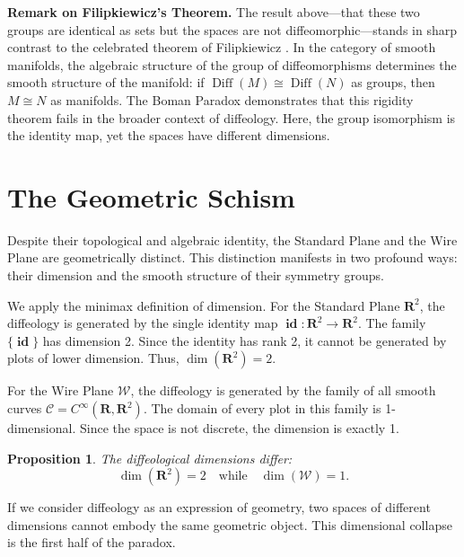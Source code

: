 \documentclass[10pt,letterpaper,reqno]{amsart}
\newcommand{\RR}{\mathbf{R}}
\newcommand{\cW}{\mathcal{W}}
\DeclareMathOperator{\id}{\mathbf{id}}
\DeclareMathOperator{\Diff}{Diff}
\newtheorem*{proposition}{Proposition}
\begin{document}
  \textbf{Remark on Filipkiewicz's Theorem.}
  The result above---that these two groups are identical as sets but the spaces are not diffeomorphic---stands in sharp contrast to the celebrated theorem of Filipkiewicz \cite{Fil82}.
  In the category of smooth manifolds,
  the algebraic structure of the group of diffeomorphisms determines the smooth structure of the manifold:
  if $\Diff(M) \cong \Diff(N)$ as groups,
  then $M \cong N$ as manifolds.
  The Boman Paradox demonstrates that this rigidity theorem fails in the broader context of diffeology.
  Here,
  the group isomorphism is the identity map,
  yet the spaces have different dimensions.
  
  
  \section{The Geometric Schism}
  
  Despite their topological and algebraic identity,
  the Standard Plane and the Wire Plane are geometrically distinct.
  This distinction manifests in two profound ways:
  their dimension and the smooth structure of their symmetry groups.
  
  We apply the minimax definition of dimension.
  For the Standard Plane $\RR^2$,
  the diffeology is generated by the single identity map $\id: \RR^2 \to \RR^2$.
  The family $\{\id\}$ has dimension 2.
  Since the identity has rank 2,
  it cannot be generated by plots of lower dimension.
  Thus,
  $\dim(\RR^2) = 2$.
  
  For the Wire Plane $\cW$,
  the diffeology is generated by the family of all smooth curves $\mathcal{C} = C^\infty(\RR, \RR^2)$.
  The domain of every plot in this family is 1-dimensional.
  Since the space is not discrete,
  the dimension is exactly 1.
  
  \begin{proposition}
    The diffeological dimensions differ:
    $$
      \dim(\RR^2) = 2 \quad \text{while} \quad \dim(\cW) = 1.
      $$
  \end{proposition}
  
  If we consider diffeology as an expression of geometry,
  two spaces of different dimensions cannot embody the same geometric object.
  This dimensional collapse is the first half of the paradox.
  
\end{document}
